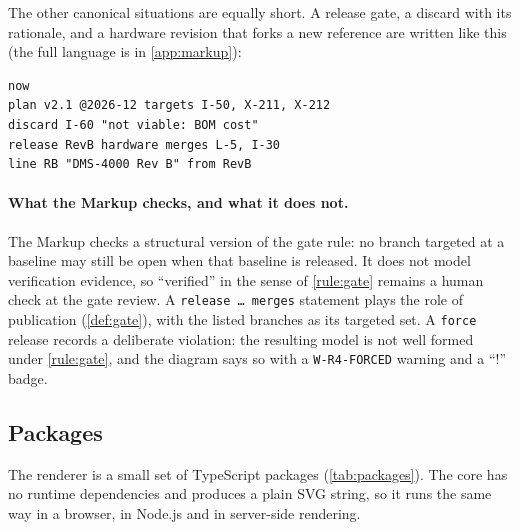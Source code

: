 

The other canonical situations are equally short. A release gate, a
discard with its rationale, and a hardware revision that forks a new
reference are written like this (the full language is in
\cref{app:markup}):
\begin{lstlisting}[style=hpb]
now
plan v2.1 @2026-12 targets I-50, X-211, X-212
discard I-60 "not viable: BOM cost"
release RevB hardware merges L-5, I-30
line RB "DMS-4000 Rev B" from RevB
\end{lstlisting}

\paragraph{What the Markup checks, and what it does not.}
The Markup checks a structural version of the gate rule: no branch
targeted at a baseline may still be open when that baseline is released.
It does not model verification evidence, so ``verified'' in the sense of
\cref{rule:gate} remains a human check at the gate review. A
\texttt{release \dots{} merges} statement plays the role of publication
(\cref{def:gate}), with the listed branches as its targeted set. A
\texttt{force} release records a deliberate violation: the resulting model
is not well formed under \cref{rule:gate}, and the diagram says so with a
\texttt{W-R4-FORCED} warning and a ``!'' badge.

\subsection{Packages}
\label{sec:tooling-packages}

The renderer is a small set of TypeScript packages
(\cref{tab:packages}). The core has no runtime dependencies and produces a
plain SVG string, so it runs the same way in a browser, in Node.js and in
server-side rendering.

